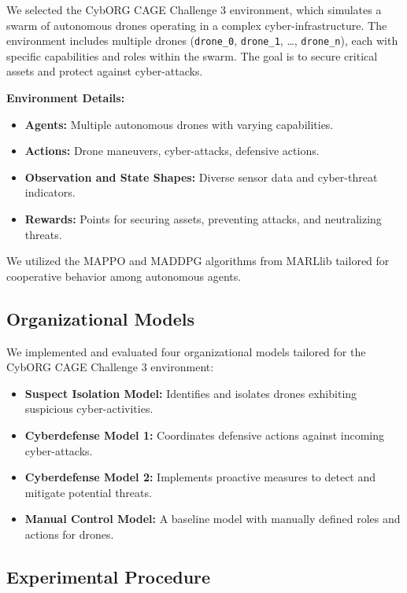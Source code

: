 \documentclass[conference]{IEEEtran}
\begin{document}
We selected the CybORG CAGE Challenge 3 environment, which simulates a swarm of autonomous drones operating in a complex cyber-infrastructure. The environment includes multiple drones (\texttt{drone\_0}, \texttt{drone\_1}, \ldots, \texttt{drone\_n}), each with specific capabilities and roles within the swarm. The goal is to secure critical assets and protect against cyber-attacks.

\textbf{Environment Details:}
\begin{itemize}
    \item \textbf{Agents:} Multiple autonomous drones with varying capabilities.
    \item \textbf{Actions:} Drone maneuvers, cyber-attacks, defensive actions.
    \item \textbf{Observation and State Shapes:} Diverse sensor data and cyber-threat indicators.
    \item \textbf{Rewards:} Points for securing assets, preventing attacks, and neutralizing threats.
\end{itemize}

We utilized the MAPPO and MADDPG algorithms from MARLlib tailored for cooperative behavior among autonomous agents.

\subsection{Organizational Models}

We implemented and evaluated four organizational models tailored for the CybORG CAGE Challenge 3 environment:

\begin{itemize}
    \item \textbf{Suspect Isolation Model:} Identifies and isolates drones exhibiting suspicious cyber-activities.
    \item \textbf{Cyberdefense Model 1:} Coordinates defensive actions against incoming cyber-attacks.
    \item \textbf{Cyberdefense Model 2:} Implements proactive measures to detect and mitigate potential threats.
    \item \textbf{Manual Control Model:} A baseline model with manually defined roles and actions for drones.
\end{itemize}

\subsection{Experimental Procedure}
\end{document}
